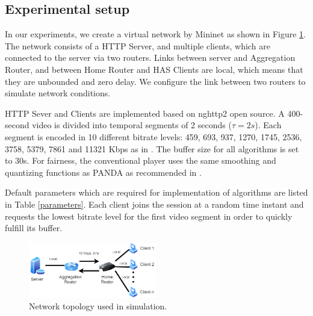 \documentclass[journal]{IEEEtran}
\begin{document}
\subsection{Experimental setup}
In our experiments, we create a virtual network by Mininet \cite{Mininet} as shown in Figure \ref{Topology}. The network consists of a HTTP Server, and multiple clients, which are connected to the server via two routers. Links between server and Aggregation Router, and between Home Router and HAS Clients are local, which means that they are unbounded and zero delay. We configure the link between two routers to simulate network conditions.
\par 
HTTP Sever and Clients are implemented based on nghttp2 open source. A 400-second video is divided into temporal segments of 2 seconds ($\tau=2s$). Each segment is encoded in 10 different bitrate levels: 459, 693, 937, 1270, 1745, 2536, 3758, 5379,
7861 and 11321 Kbps as in \cite{PANDA}. The buffer size for all algorithms is set to 30s. For fairness, the conventional
player uses the same smoothing and quantizing functions as PANDA as recommended in \cite{PANDA}.
\par Default parameters which are required for implementation of algorithms are listed in Table \ref{parameters}. Each client joins the session at a random time instant and requests the lowest bitrate level for the first video segment in order to quickly fulfill its buffer. 
\begin{figure}[!h]
	\centering
	
	\includegraphics[width=0.5\textwidth]{images/Topology.PNG}
	
	
	
	\caption{Network topology used in simulation.}
	\label {Topology}
	
\end{figure} 
\end{document}
